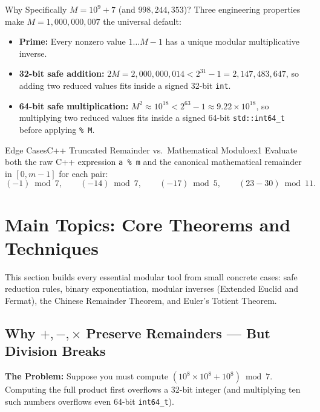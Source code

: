 \documentclass[11pt,a4paper]{article}
\theoremstyle{definition}
\newcommand{\painbeat}{\textbf{\color{accentamber}The Problem:} }
\begin{document}
\begin{calloutbox}{Why Specifically $M = 10^9 + 7$ (and $998{,}244{,}353$)?}
Three engineering properties make $M = 1{,}000{,}000{,}007$ the universal default:
\begin{itemize}
    \item \textbf{Prime:} Every nonzero value $1 \dots M - 1$ has a unique modular multiplicative inverse.
    \item \textbf{32-bit safe addition:} $2M = 2{,}000{,}000{,}014 < 2^{31} - 1 = 2{,}147{,}483{,}647$, so adding two reduced values fits inside a signed 32-bit \texttt{int}.
    \item \textbf{64-bit safe multiplication:} $M^2 \approx 10^{18} < 2^{63} - 1 \approx 9.22 \times 10^{18}$, so multiplying two reduced values fits inside a signed 64-bit \texttt{std::int64\_t} before applying \texttt{\% M}.
\end{itemize}
\end{calloutbox}

\begin{tryitbox}{Edge Cases}{C++ Truncated Remainder vs.\ Mathematical Modulo}{ex1}
Evaluate both the raw C++ expression \texttt{a \% m} and the canonical mathematical remainder in $[0, m - 1]$ for each pair:
\[
    (-1) \bmod 7, \qquad (-14) \bmod 7, \qquad (-17) \bmod 5, \qquad (23 - 30) \bmod 11.
\]
\end{tryitbox}

\section{Main Topics: Core Theorems and Techniques}

This section builds every essential modular tool from small concrete cases: safe reduction rules, binary exponentiation, modular inverses (Extended Euclid and Fermat), the Chinese Remainder Theorem, and Euler's Totient Theorem.

\subsection{Why $+, -, \times$ Preserve Remainders --- But Division Breaks}

\painbeat Suppose you must compute $(10^8 \times 10^8 + 10^8) \bmod 7$. Computing the full product first overflows a 32-bit integer (and multiplying ten such numbers overflows even 64-bit \texttt{int64\_t}).
\end{document}
